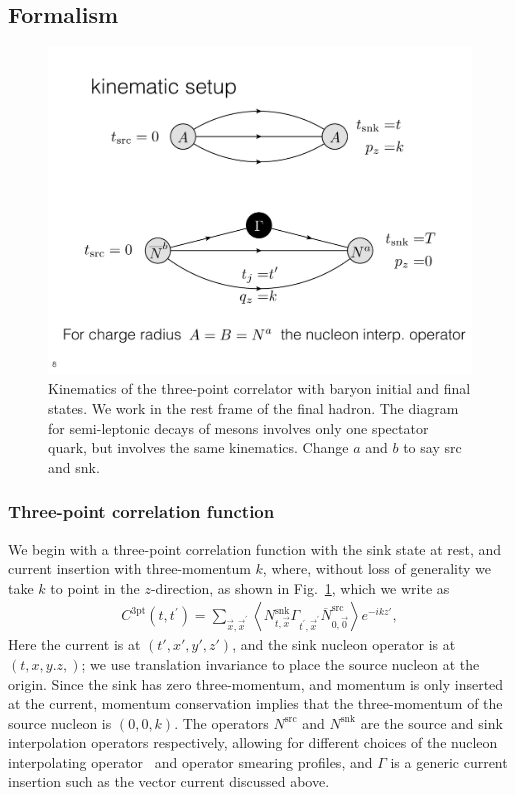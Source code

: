 \documentclass[prd,aps,twocolumn,superscriptaddress,tightenlines,nofootinbib,floatfix,preprintnumbers,10pt]{revtex4-1}
\begin{document}
\subsection{Formalism}
\begin{figure}[t]
	\centering
	\includegraphics[width=\columnwidth]{./cropped_kinematics.pdf}
	\caption{Kinematics of the three-point correlator with baryon initial and final states. We work in the rest frame of the final hadron. The diagram for semi-leptonic decays of mesons involves only one spectator quark, but involves the same kinematics. {\color{red} Change $a$ and $b$ to say src and snk.}}
	\label{fig:3pt_kinematics}
\end{figure}
\subsubsection{Three-point correlation function}
We begin with a three-point correlation function with the sink state at
rest, and current insertion with three-momentum $k$, where, without
loss of generality we take $k$ to point
in the $z$-direction, as shown in
Fig.~\ref{fig:3pt_kinematics}, which we write as
\begin{align}
C^{\text{3pt}}(t, t^\prime) = \sum_{\vec{x},\vec{x}^\prime} \left<N^{\mathrm{snk}}_{t,\vec{x}}\Gamma_{t^\prime,\vec{x}^\prime} \overline{N}^{\mathrm{src}}_{0,\vec{0}}\right> e^{-ikz'},
\label{eq:3pt}
\end{align}
Here the current is at $(t', x', y', z')$, and the sink nucleon
operator is at $(t,x,y.z,)$; we use translation invariance to place the
source nucleon at the origin.
Since the sink has
zero three-momentum, and momentum is only inserted at the current,
momentum conservation implies that the three-momentum of the source
nucleon is $(0,0,k)$.
The operators $N^{\mathrm{src}}$ and
$N^{\mathrm{snk}}$ are the source and sink interpolation operators
respectively, allowing for different choices of the nucleon
interpolating operator~\cite{Basak:2005ir,Basak:2007kj} and operator
smearing profiles, and $\Gamma$ is a generic current
insertion such as the vector current discussed above.
\end{document}
